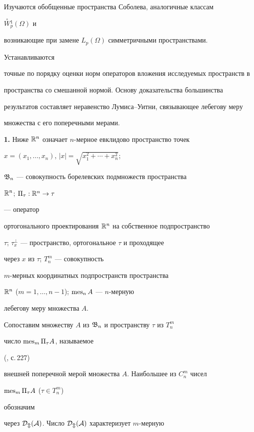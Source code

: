  


Изучаются обобщенные пространства Соболева, аналогичные классам 


$\overset{\circ}{W}{}^1_p(\Omega)$ и 


возникающие при замене $L_p(\Omega)$ симметричными пространствами.


Устанавливаются 


точные по порядку оценки норм операторов вложения исследуемых пространств в 


пространства со смешанной нормой. Основу доказательства большинства 


результатов составляет неравенство Лумиса--Уитни, связывающее лебегову меру 


множества с его поперечными мерами. 


 


{\bf 1.} Ниже $\Bbb R^n$ означает $n$-мерное евклидово пространство точек 


$x=(x_1,\dotsc,x_n)$, $|x|=\sqrt{x_1^2+\dotsb+x_n^2}$;


$\frak B_n$ --- совокупность борелевских подмножеств пространства 


$\Bbb R^n$; $\Pi_\tau:\Bbb R^n\to \tau$


--- оператор 


ортогонального проектирования $\Bbb R^n$ на собственное подпространство 


$\tau$; $\tau_x^\perp$ --- пространство, ортогональное $\tau$ и проходящее 


через $x$ из $\tau$; $T^m_n$ --- совокупность 


$m$-мерных координатных подпространств пространства 


$\Bbb R^n$ ($m=1,\dotsc,n-1$); $\operatorname{mes}_n A$ --- $n$-мерную 


лебегову меру множества $A$. 


 


Сопоставим множеству $A$ из $\frak B_n$ и пространству $\tau$ из $T^m_n$ 


число $\operatorname{mes}_m\Pi_\tau A$, называемое 


(\cite{Had}, с.\,227)


внешней поперечной мерой множества $A$. Наибольшее из $C^m_n$ чисел 


$\operatorname{mes}_m\Pi_\tau A$ ($\tau\in T^m_n$)


обозначим 


через $\cal D_m(A)$. Число $\cal D_m(A)$ характеризует $m$-мерную 


